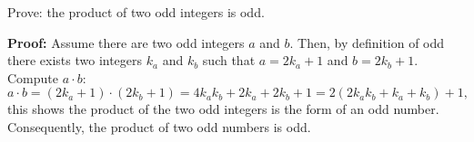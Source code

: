\begin{questions}

\ifprintanswers
\else
{}





\fi


 Prove: the product of two odd integers is odd. 
    \ifprintanswers
        \vspace{-10pt}
    \fi
\begin{solution} 
\textbf{Proof:} Assume there are two odd integers $a$ and $b$.  Then, by definition of odd there exists two integers $k_a$ and $k_b$ such that $a=2k_a + 1$ and $b=2k_b + 1$.  Compute $a \cdot b$:
    $$ a\cdot b = (2k_a + 1)\cdot(2k_b + 1) = 4k_ak_b + 2k_a + 2k_b + 1 = 2(2k_ak_b + k_a + k_b) + 1,$$ 
    this shows the product of the two odd integers is the form of an odd number.
    Consequently, the product of two odd numbers is odd.
\end{solution}




\end{questions}
